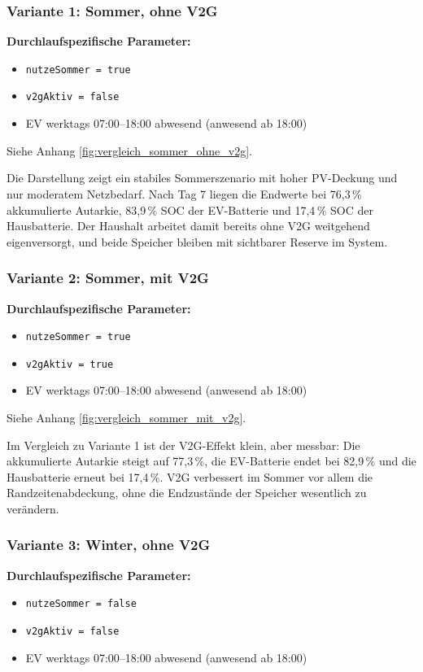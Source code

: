\documentclass[conference]{IEEEtran}
\begin{document}
\subsubsection{Variante 1: Sommer, ohne V2G}

\textbf{Durchlaufspezifische Parameter:}
\begin{itemize}
\item \texttt{nutzeSommer = true}
\item \texttt{v2gAktiv = false}
\item EV werktags 07:00--18:00 abwesend (anwesend ab 18:00)
\end{itemize}

Siehe Anhang \ref{fig:vergleich_sommer_ohne_v2g}.

Die Darstellung zeigt ein stabiles Sommerszenario mit hoher PV-Deckung und nur moderatem Netzbedarf. Nach Tag 7 liegen die Endwerte bei 76,3\,\% akkumulierte Autarkie, 83,9\,\% SOC der EV-Batterie und 17,4\,\% SOC der Hausbatterie. Der Haushalt arbeitet damit bereits ohne V2G weitgehend eigenversorgt, und beide Speicher bleiben mit sichtbarer Reserve im System.

\subsubsection{Variante 2: Sommer, mit V2G}
\textbf{Durchlaufspezifische Parameter:}
\begin{itemize}
\item \texttt{nutzeSommer = true}
\item \texttt{v2gAktiv = true}
\item EV werktags 07:00--18:00 abwesend (anwesend ab 18:00)
\end{itemize}

Siehe Anhang \ref{fig:vergleich_sommer_mit_v2g}.

Im Vergleich zu Variante 1 ist der V2G-Effekt klein, aber messbar: Die akkumulierte Autarkie steigt auf 77,3\,\%, die EV-Batterie endet bei 82,9\,\% und die Hausbatterie erneut bei 17,4\,\%. V2G verbessert im Sommer vor allem die Randzeitenabdeckung, ohne die Endzustände der Speicher wesentlich zu verändern.

\subsubsection{Variante 3: Winter, ohne V2G}
\textbf{Durchlaufspezifische Parameter:}
\begin{itemize}
\item \texttt{nutzeSommer = false}
\item \texttt{v2gAktiv = false}
\item EV werktags 07:00--18:00 abwesend (anwesend ab 18:00)
\end{itemize}
\end{document}
